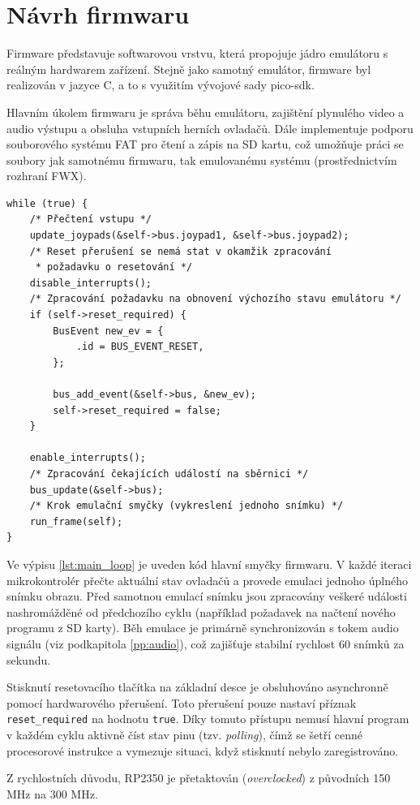 \chapter{Návrh firmwaru}

Firmware představuje softwarovou vrstvu, která propojuje jádro emulátoru s reálným hardwarem
zařízení. Stejně jako samotný emulátor, firmware byl realizován v jazyce C, a to s využitím vývojové
sady pico-sdk.

Hlavním úkolem firmwaru je správa běhu emulátoru, zajištění plynulého video a audio výstupu a
obsluha vstupních herních ovladačů. Dále implementuje podporu souborového systému FAT pro čtení a
zápis na SD kartu, což umožňuje práci se soubory jak samotnému firmwaru, tak emulovanému systému
(prostřednictvím rozhraní FWX).

\begin{listing}[htbp]
\begin{verbatim}
while (true) {
    /* Přečtení vstupu */
    update_joypads(&self->bus.joypad1, &self->bus.joypad2);
    /* Reset přerušení se nemá stat v okamžik zpracování
     * požadavku o resetování */
    disable_interrupts();
    /* Zpracování požadavku na obnovení výchozího stavu emulátoru */
    if (self->reset_required) {
        BusEvent new_ev = {
            .id = BUS_EVENT_RESET,
        };

        bus_add_event(&self->bus, &new_ev);
        self->reset_required = false;
    }

    enable_interrupts();
    /* Zpracování čekajících událostí na sběrnici */
    bus_update(&self->bus);
    /* Krok emulační smyčky (vykreslení jednoho snímku) */
    run_frame(self);
}
\end{verbatim}
\caption{Hlavní smyčka programu firmwaru.}
\label{lst:main_loop}
\end{listing}

Ve výpisu \ref{lst:main_loop} je uveden kód hlavní smyčky firmwaru. V každé iteraci mikrokontrolér
přečte aktuální stav ovladačů a provede emulaci jednoho úplného snímku obrazu. Před samotnou emulací
snímku jsou zpracovány veškeré události nashromážděné od předchozího cyklu (například požadavek na
načtení nového programu z SD karty). Běh emulace je primárně synchronizován s tokem audio signálu
(viz podkapitola \ref{pp:audio}), což zajišťuje stabilní rychlost 60 snímků za sekundu.

Stisknutí resetovacího tlačítka na základní desce je obsluhováno asynchronně pomocí
hardwarového přerušení. Toto přerušení pouze nastaví příznak \texttt{reset\_required} na hodnotu
\texttt{true}. Díky tomuto přístupu nemusí hlavní program v každém cyklu aktivně číst stav pinu
(tzv. \textit{polling}), čímž se šetří cenné procesorové instrukce a vymezuje situaci, když
stisknutí nebylo zaregistrováno.

Z rychlostních důvodu, RP2350 je přetaktován (\textit{overclocked}) z původních 150 MHz na 300 MHz.
